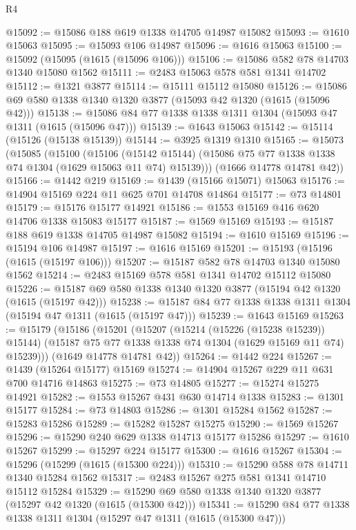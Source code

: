\begin{lexlean}{R4}
\begin{coremodule}
@15092 := @15086 @188 @619 @1338 @14705 @14987 @15082
@15093 := @1610 @15063
@15095 := @15093 @106 @14987
@15096 := @1616 @15063
@15100 := @15092 (@15095 (@1615 (@15096 @106)))
@15106 := @15086 @582 @78 @14703 @1340 @15080 @1562
@15111 := @2483 @15063 @578 @581 @1341 @14702
@15112 := @1321 @3877
@15114 := @15111 @15112 @15080
@15126 := @15086 @69 @580 @1338 @1340 @1320 @3877 (@15093 @42 @1320 (@1615 (@15096 @42)))
@15138 := @15086 @84 @77 @1338 @1338 @1311 @1304 (@15093 @47 @1311 (@1615 (@15096 @47)))
@15139 := @1643 @15063
@15142 := @15114 (@15126 (@15138 @15139))
@15144 := @3925 @1319 @1310
@15165 := @15073
    (@15085
      (@15100
        (@15106
          (@15142 @15144)
          (@15086 @75 @77 @1338 @1338 @74 @1304 (@1629 @15063 @11 @74) @15139)))
      (@1666 @14778 @14781 @42))
@15166 := @1442 @219
@15169 := @1439 (@15166 @15071) @15063
@15176 := @14904 @15169 @224 @11 @625 @701 @14708 @14864
@15177 := @73 @14801
@15179 := @15176 @15177 @14921
@15186 := @1553 @15169 @416 @620 @14706 @1338 @15083 @15177
@15187 := @1569 @15169
@15193 := @15187 @188 @619 @1338 @14705 @14987 @15082
@15194 := @1610 @15169
@15196 := @15194 @106 @14987
@15197 := @1616 @15169
@15201 := @15193 (@15196 (@1615 (@15197 @106)))
@15207 := @15187 @582 @78 @14703 @1340 @15080 @1562
@15214 := @2483 @15169 @578 @581 @1341 @14702 @15112 @15080
@15226 := @15187 @69 @580 @1338 @1340 @1320 @3877 (@15194 @42 @1320 (@1615 (@15197 @42)))
@15238 := @15187 @84 @77 @1338 @1338 @1311 @1304 (@15194 @47 @1311 (@1615 (@15197 @47)))
@15239 := @1643 @15169
@15263 := @15179
    (@15186
      (@15201
        (@15207
          (@15214 (@15226 (@15238 @15239)) @15144)
          (@15187 @75 @77 @1338 @1338 @74 @1304 (@1629 @15169 @11 @74) @15239)))
      (@1649 @14778 @14781 @42))
@15264 := @1442 @224
@15267 := @1439 (@15264 @15177) @15169
@15274 := @14904 @15267 @229 @11 @631 @700 @14716 @14863
@15275 := @73 @14805
@15277 := @15274 @15275 @14921
@15282 := @1553 @15267 @431 @630 @14714 @1338
@15283 := @1301 @15177
@15284 := @73 @14803
@15286 := @1301 @15284 @1562
@15287 := @15283 @15286
@15289 := @15282 @15287 @15275
@15290 := @1569 @15267
@15296 := @15290 @240 @629 @1338 @14713 @15177 @15286
@15297 := @1610 @15267
@15299 := @15297 @224 @15177
@15300 := @1616 @15267
@15304 := @15296 (@15299 (@1615 (@15300 @224)))
@15310 := @15290 @588 @78 @14711 @1340 @15284 @1562
@15317 := @2483 @15267 @275 @581 @1341 @14710 @15112 @15284
@15329 := @15290 @69 @580 @1338 @1340 @1320 @3877 (@15297 @42 @1320 (@1615 (@15300 @42)))
@15341 := @15290 @84 @77 @1338 @1338 @1311 @1304 (@15297 @47 @1311 (@1615 (@15300 @47)))

\end{coremodule}
\end{lexlean}
